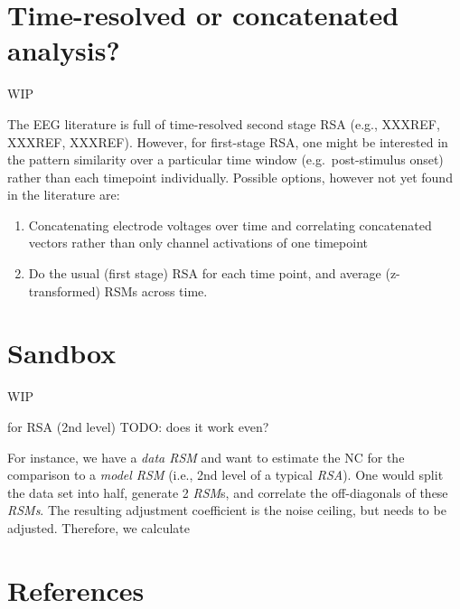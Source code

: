 \documentclass[
  letterpaper,
  DIV=11,
  numbers=noendperiod]{scrartcl}
\providecommand{\tightlist}{%
  \setlength{\itemsep}{0pt}\setlength{\parskip}{0pt}}\usepackage{longtable,booktabs,array}
\begin{document}
\hypertarget{sec-tr}{%
\section{Time-resolved or concatenated analysis?}\label{sec-tr}}

WIP

The EEG literature is full of time-resolved second stage RSA (e.g.,
XXXREF, XXXREF, XXXREF). However, for first-stage RSA, one might be
interested in the pattern similarity over a particular time window
(e.g.~post-stimulus onset) rather than each timepoint individually.
Possible options, however not yet found in the literature are:

\begin{enumerate}
\def\labelenumi{\arabic{enumi}.}
\tightlist
\item
  Concatenating electrode voltages over time and correlating
  concatenated vectors rather than only channel activations of one
  timepoint
\item
  Do the usual (first stage) RSA for each time point, and average
  (z-transformed) RSMs across time.
\end{enumerate}

\hypertarget{sandbox}{%
\section{Sandbox}\label{sandbox}}

WIP

for RSA (2nd level) TODO: does it work even?

For instance, we have a \emph{data RSM} and want to estimate the NC for
the comparison to a \emph{model RSM} (i.e., 2nd level of a typical
\emph{RSA}). One would split the data set into half, generate 2
\emph{RSM}s, and correlate the off-diagonals of these \emph{RSMs}. The
resulting adjustment coefficient is the noise ceiling, but needs to be
adjusted. Therefore, we calculate

\hypertarget{references}{%
\section{References}\label{references}}
\end{document}

